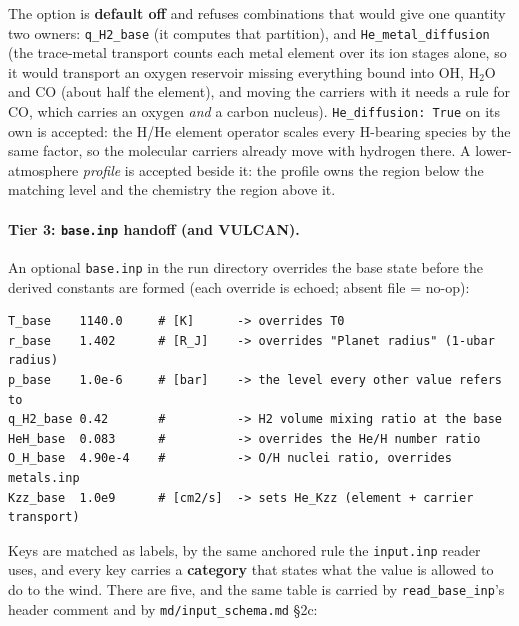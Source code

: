 \documentclass[english,a4paper]{my_memo}
\begin{document}
The option is \textbf{default off} and refuses combinations that would give one
quantity two owners: \texttt{q\_H2\_base} (it computes that partition), and
\texttt{He\_metal\_diffusion} (the trace-metal transport counts each metal element
over its ion stages alone, so it would transport an oxygen reservoir missing
everything bound into OH, H$_2$O and CO (about half the element), and
moving the carriers with it needs a rule for CO, which carries an oxygen
\emph{and} a carbon nucleus). \texttt{He\_diffusion: True} on its own is
accepted: the H/He element operator scales every H-bearing species by the same
factor, so the molecular carriers already move with hydrogen there. A
lower-atmosphere \emph{profile} is accepted beside it: the profile owns the
region below the matching level and the chemistry the region above it.

\paragraph{Tier 3: \texttt{base.inp} handoff (and VULCAN).}
An optional \texttt{base.inp} in the run directory overrides the base state
before the derived constants are formed (each override is echoed; absent file =
no-op):
\begin{verbatim}
T_base    1140.0     # [K]      -> overrides T0
r_base    1.402      # [R_J]    -> overrides "Planet radius" (1-ubar radius)
p_base    1.0e-6     # [bar]    -> the level every other value refers to
q_H2_base 0.42       #          -> H2 volume mixing ratio at the base
HeH_base  0.083      #          -> overrides the He/H number ratio
O_H_base  4.90e-4    #          -> O/H nuclei ratio, overrides metals.inp
Kzz_base  1.0e9      # [cm2/s]  -> sets He_Kzz (element + carrier transport)
\end{verbatim}
Keys are matched as labels, by the same anchored rule the \texttt{input.inp}
reader uses, and every key carries a \textbf{category} that states what the
value is allowed to do to the wind. There are five, and the same table is
carried by \texttt{read\_base\_inp}'s header comment and by
\texttt{md/input\_schema.md} \S2c:
\end{document}

